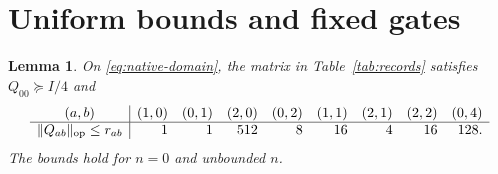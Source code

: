 \documentclass[10pt]{article}
\newtheorem{lemma}{Lemma}
\newcommand{\ps}{\succeq}
\begin{document}
\section{Uniform bounds and fixed gates}
\begin{lemma}\label{lem:bounds}
On \eqref{eq:native-domain}, the matrix in Table~\ref{tab:records} satisfies
$Q_{00}\ps I/4$ and
\begin{equation}
\begin{array}{c|rrrrrrrr}
(a,b)&(1,0)&(0,1)&(2,0)&(0,2)&(1,1)&(2,1)&(2,2)&(0,4)\\ \hline
\|Q_{ab}\|_{\rm op}\leq r_{ab}&1&1&512&8&16&4&16&128 .
\end{array} \label{eq:bounds}
\end{equation}
The bounds hold for $n=0$ and unbounded $n$.
\end{lemma}
\end{document}
